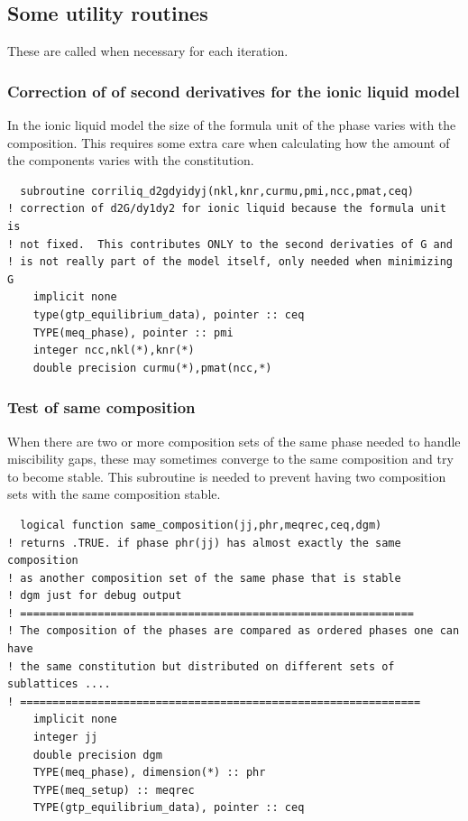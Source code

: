 \documentclass[12pt]{article}
\begin{document}
\subsection{Some utility routines}

These are called when necessary for each iteration.

\subsubsection{Correction of of second derivatives for the ionic liquid model}

In the ionic liquid model the size of the formula unit of the phase
varies with the composition.  This requires some extra care when
calculating how the amount of the components varies with the
constitution.

{\small
\begin{verbatim}
  subroutine corriliq_d2gdyidyj(nkl,knr,curmu,pmi,ncc,pmat,ceq)
! correction of d2G/dy1dy2 for ionic liquid because the formula unit is
! not fixed.  This contributes ONLY to the second derivaties of G and
! is not really part of the model itself, only needed when minimizing G
    implicit none
    type(gtp_equilibrium_data), pointer :: ceq
    TYPE(meq_phase), pointer :: pmi
    integer ncc,nkl(*),knr(*)
    double precision curmu(*),pmat(ncc,*)
\end{verbatim}
}

\subsubsection{Test of same composition}

When there are two or more composition sets of the same phase needed
to handle miscibility gaps, these may sometimes converge to the same
composition and try to become stable.  This subroutine is needed to
prevent having two composition sets with the same composition stable.

{\small
\begin{verbatim}
  logical function same_composition(jj,phr,meqrec,ceq,dgm)
! returns .TRUE. if phase phr(jj) has almost exactly the same composition
! as another composition set of the same phase that is stable
! dgm just for debug output
! =============================================================
! The composition of the phases are compared as ordered phases one can have
! the same constitution but distributed on different sets of sublattices ....
! ==============================================================
    implicit none
    integer jj
    double precision dgm
    TYPE(meq_phase), dimension(*) :: phr
    TYPE(meq_setup) :: meqrec
    TYPE(gtp_equilibrium_data), pointer :: ceq
\end{verbatim}
}
\end{document}
